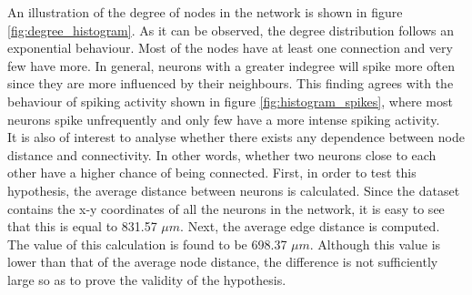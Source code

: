 An illustration of the degree of nodes in the network is shown in figure \ref{fig:degree_histogram}. As it can be observed, the degree distribution follows an exponential behaviour. Most of the nodes have at least one connection and very few have more. In general, neurons with a greater indegree will spike more often since they are more influenced by their neighbours. This finding agrees with the behaviour of spiking activity shown in figure \ref{fig:histogram_spikes}, where most neurons spike unfrequently and only few have a more intense spiking activity.\\

It is also of interest to analyse whether there exists any dependence between node distance and connectivity. In other words, whether two neurons close to each other have a higher chance of being connected. First, in order to test this hypothesis, the average distance between neurons is calculated. Since the dataset contains the x-y coordinates of all the neurons in the network, it is easy to see that this is equal to 831.57 \(\mu m\). Next, the average edge distance is computed. The value of this calculation is found to be 698.37 \(\mu m\). Although this value is lower than that of the average node distance, the difference is not sufficiently large so as to prove the validity of the hypothesis.









